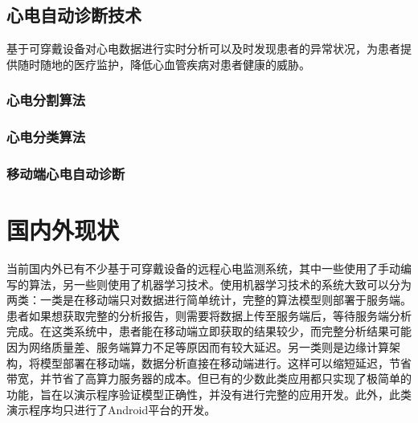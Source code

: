 \subsection{心电自动诊断技术}\label{subsec:diagnosis}


基于可穿戴设备对心电数据进行实时分析可以及时发现患者的异常状况，为患者提供随时随地的医疗监护，降低心血管疾病对患者健康的威胁。

\subsubsection{心电分割算法}\label{subsubsec:segmentation}


\subsubsection{心电分类算法}\label{subsubsec:classification}


\subsubsection{移动端心电自动诊断}\label{subsubsec:mobile}



\section{国内外\app 现状}\label{sec:status}


当前国内外已有不少基于可穿戴设备的远程心电监测系统，其中一些使用了手动编写的算法\cite{zhengJiyukechuandaishebeideyidongjianhuAPP2019,wuYidongxindianjiancexitongdeyanjiuyushixian2018,chenYidongxindianxinxijianhuxitongjixindianjiancesuanfadeyanjiu2018,heJiyuyidongpingtaidexindianjianceyiliaoxitongdeshixian2017,gradlRealtimeECGMonitoring2012,wenRealtimeECGTelemonitoring2008}，另一些则使用了机器学习技术。使用机器学习技术的系统大致可以分为两类：一类是在移动端只对数据进行简单统计，完整的算法模型则部署于服务端\cite{wangJiyushenduxuexideyidongyuanchengxindianjiancexitongshejiyushixian2020,singhSmartECGMonitoring2022}。患者如果想获取完整的分析报告，则需要将数据上传至服务端后，等待服务端分析完成。在这类系统中，患者能在移动端立即获取的结果较少，而完整分析结果可能因为网络质量差、服务端算力不足等原因而有较大延迟。另一类则是边缘计算架构，将模型部署在移动端，数据分析直接在移动端进行\cite{chenJiyushenduxuexidexindianfenximoxingdeshejiyuyouhua2021,liuJiyuyidongzhongduanfenxidekechuandairouxingxindianjiancexitong2021,wangEnablingSmartPersonalized2014,jinPredictingCardiovascularDisease2009}。这样可以缩短延迟，节省带宽，并节省了高算力服务器的成本。但已有的少数此类应用都只实现了极简单的功能，旨在以演示程序验证模型正确性，并没有进行完整的应用开发。此外，此类演示程序均只进行了Android平台的开发。


